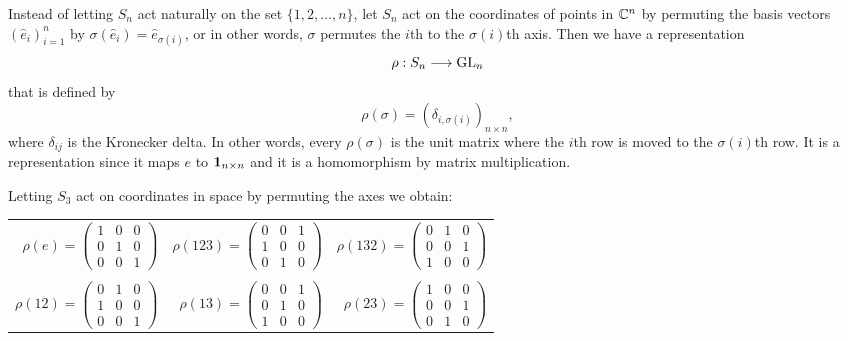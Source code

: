 	Instead of letting $S_n$ act naturally on the set $\{1, 2, \dots, n\}$, let $S_n$ act on the coordinates of points in $\mathbb{C}^n$ by permuting the basis vectors $(\hat{e}_i)_{i=1}^n$ by $\sigma(\hat{e}_i) = \hat{e}_{\sigma(i)}$, or in other words, $\sigma$ permutes the $i$th to the $\sigma(i)$th axis. Then we have a representation
	\[
	\rho: S_n \longrightarrow \text{GL}_n
	\]
	that is defined by 
	\[
	\rho(\sigma) = \left(\delta_{i, \sigma(i)}\right)_{n \times n},
	\]
	where $\delta_{ij}$ is the Kronecker delta. In other words, every $\rho(\sigma)$ is the unit matrix where the $i$th row is moved to the $\sigma(i)$th row. It is a representation since it maps $e$ to $\mathbf{1}_{n  \times n}$ and it is a homomorphism by matrix multiplication.
	
	\begin{example}
		Letting $S_3$ act on coordinates in space by permuting the axes we obtain:
		\begin{table}[hbt!]
			\centering
			\begin{tabular}{r r r}
				$\rho(e) = 
				\begin{pmatrix}
					1 & 0 & 0 \\
					0 & 1 & 0 \\
					0 & 0 & 1
				\end{pmatrix}$ & 
				$\rho(123) = 
				\begin{pmatrix}
					0 & 0 & 1 \\
					1 & 0 & 0 \\
					0 & 1 & 0
				\end{pmatrix}$ & 
				$\rho(132) = 
				\begin{pmatrix}
					0 & 1 & 0 \\
					0 & 0 & 1 \\
					1 & 0 & 0
				\end{pmatrix}$ \\ & & \\
				$\rho(12) = 
				\begin{pmatrix}
					0 & 1 & 0 \\
					1 & 0 & 0 \\
					0 & 0 & 1
				\end{pmatrix}$ &
				$\rho(13) = 
				\begin{pmatrix}
					0 & 0 & 1 \\
					0 & 1 & 0 \\
					1 & 0 & 0
				\end{pmatrix}$ &
				$\rho(23) = 
				\begin{pmatrix}
					1 & 0 & 0 \\
					0 & 0 & 1 \\
					0 & 1 & 0
				\end{pmatrix}$
			\end{tabular}
		\end{table}
	\end{example}
	
